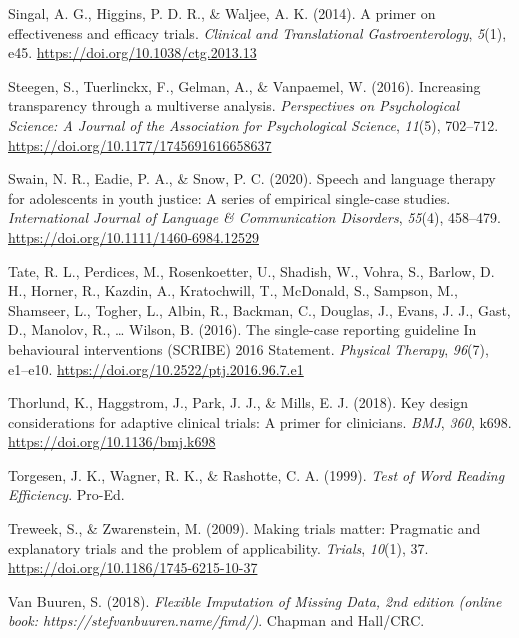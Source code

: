 \documentclass{krantz}
\newlength{\cslhangindent}
\newlength{\cslentryspacingunit} %
\newenvironment{CSLReferences}[2] %
{%
\setlength{\parindent}{0pt}
\ifodd #1
\let\oldpar\par
\def\par{\hangindent=\cslhangindent\oldpar}
\fi
\setlength{\parskip}{#2\cslentryspacingunit}
}%
{}
\begin{document}
\begin{CSLReferences}{1}{0}
\leavevmode{}%
Singal, A. G., Higgins, P. D. R., \& Waljee, A. K. (2014). A primer on effectiveness and efficacy trials. \emph{Clinical and Translational Gastroenterology}, \emph{5}(1), e45. \url{https://doi.org/10.1038/ctg.2013.13}

\leavevmode{}%
Steegen, S., Tuerlinckx, F., Gelman, A., \& Vanpaemel, W. (2016). Increasing transparency through a multiverse analysis. \emph{Perspectives on Psychological Science: A Journal of the Association for Psychological Science}, \emph{11}(5), 702--712. \url{https://doi.org/10.1177/1745691616658637}

\leavevmode{}%
Swain, N. R., Eadie, P. A., \& Snow, P. C. (2020). Speech and language therapy for adolescents in youth justice: {A} series of empirical single-case studies. \emph{International Journal of Language \& Communication Disorders}, \emph{55}(4), 458--479. \url{https://doi.org/10.1111/1460-6984.12529}

\leavevmode{}%
Tate, R. L., Perdices, M., Rosenkoetter, U., Shadish, W., Vohra, S., Barlow, D. H., Horner, R., Kazdin, A., Kratochwill, T., McDonald, S., Sampson, M., Shamseer, L., Togher, L., Albin, R., Backman, C., Douglas, J., Evans, J. J., Gast, D., Manolov, R., \ldots{} Wilson, B. (2016). The single-case reporting guideline {In} behavioural interventions ({SCRIBE}) 2016 {Statement}. \emph{Physical Therapy}, \emph{96}(7), e1--e10. \url{https://doi.org/10.2522/ptj.2016.96.7.e1}

\leavevmode{}%
Thorlund, K., Haggstrom, J., Park, J. J., \& Mills, E. J. (2018). Key design considerations for adaptive clinical trials: A primer for clinicians. \emph{BMJ}, \emph{360}, k698. \url{https://doi.org/10.1136/bmj.k698}

\leavevmode{}%
Torgesen, J. K., Wagner, R. K., \& Rashotte, C. A. (1999). \emph{Test of {Word Reading Efficiency}}. {Pro-Ed}.

\leavevmode{}%
Treweek, S., \& Zwarenstein, M. (2009). Making trials matter: Pragmatic and explanatory trials and the problem of applicability. \emph{Trials}, \emph{10}(1), 37. \url{https://doi.org/10.1186/1745-6215-10-37}

\leavevmode{}%
Van Buuren, S. (2018). \emph{Flexible {Imputation} of {Missing Data}, 2nd edition (online book: {https://stefvanbuuren.name/fimd/)}}. {Chapman and Hall/CRC}.


\end{CSLReferences}
\end{document}
